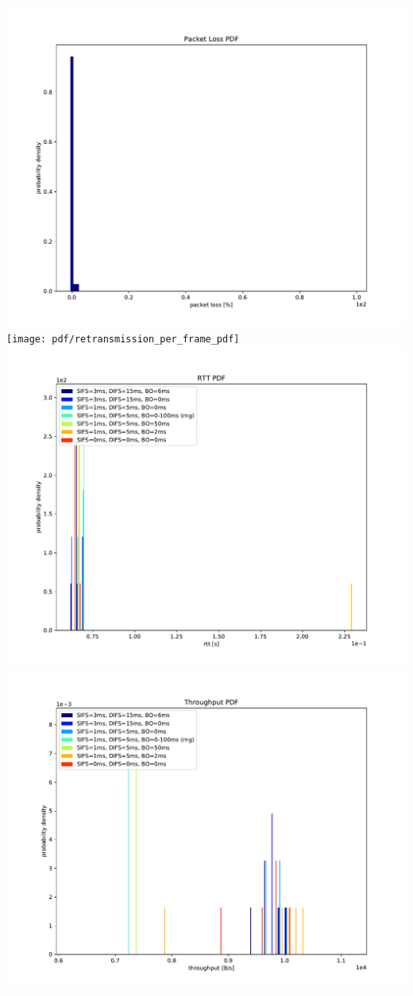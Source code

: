\documentclass{article}
\begin{document}
	\includegraphics[width=\textwidth]{pdf/packet_loss_pdf}
	\texttt{[image: pdf/retransmission\_per\_frame\_pdf]}
	\includegraphics[width=\textwidth]{pdf/rtt_pdf}
	\includegraphics[width=\textwidth]{pdf/throughput_pdf}
\end{document}
